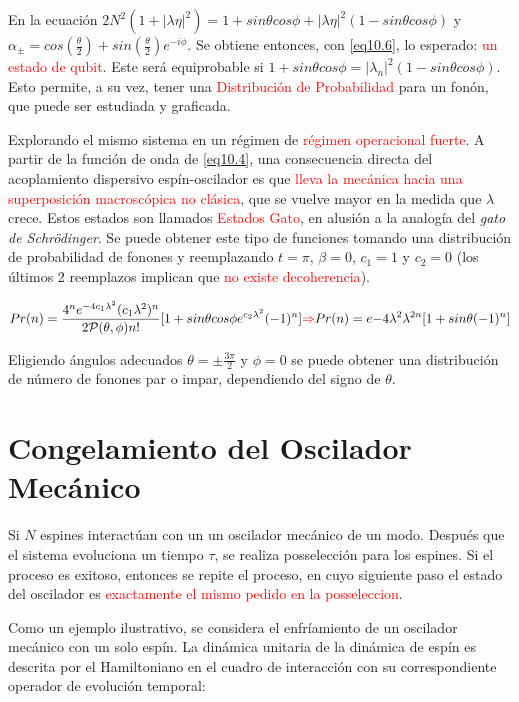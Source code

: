 \documentclass{book}
\begin{document}
En la ecuación $2N^2(1+\lvert\lambda\eta\rvert^2)=1+sin\theta cos\phi+\lvert\lambda\eta\rvert^2(1-sin\theta cos\phi)$ y $\alpha_\pm=cos(\frac{\theta}{2})+sin(\frac{\theta}{2})e^{-i\phi}$. Se obtiene entonces, con \ref{eq10.6}, lo esperado: \textcolor{red}{un estado de qubit}. Este será equiprobable si $1+sin\theta cos\phi=\lvert\lambda_n\rvert^2(1-sin\theta cos\phi)$. Esto permite, a su vez, tener una \textcolor{red}{Distribución de Probabilidad} para un fonón, que puede ser estudiada y graficada.

Explorando el mismo sistema en un régimen de \textcolor{red}{régimen operacional fuerte}. A partir de la función de onda de \ref{eq10.4}, una consecuencia directa del acoplamiento dispersivo espín-oscilador es que \textcolor{red}{lleva la mecánica hacia una superposición macroscópica no clásica}, que se vuelve mayor en la medida que $\lambda$ crece. Estos estados son llamados \textcolor{red}{Estados Gato}, en alusión a la analogía del \textit{gato de Schr\"odinger}. Se puede obtener este tipo de funciones tomando una distribución de probabilidad de fonones y reemplazando $t=\pi$, $\beta=0$, $c_1=1$ y $c_2=0$ (los últimos 2 reemplazos implican que \textcolor{red}{no existe decoherencia}).

\begin{equation}\label{eq10.7}Pr(n)=\frac{4^ne^{-4c_1\lambda^2}(c_1\lambda^2)^n}{2\mathcal{P}(\theta,\phi)n!}[1+sin\theta cos\phi e^{c_2\lambda^2}(-1)^n]\textcolor{red}{\Rightarrow}Pr(n)=e {-4\lambda^2}\lambda^{2n}[1+sin\theta(-1)^n]\end{equation}

Eligiendo ángulos adecuados $\theta=\pm \frac{3\pi}{2}$ y $\phi=0$ se puede obtener una distribución de número de fonones par o impar, dependiendo del signo de $\theta$.

\section{Congelamiento del Oscilador Mecánico}

Si $N$ espines interactúan con un un oscilador mecánico de un modo. Después que el sistema evoluciona un tiempo $\tau$, se realiza posselección para los espines. Si el proceso es exitoso, entonces se repite el proceso, en cuyo siguiente paso el estado del oscilador es \textcolor{red}{exactamente el mismo pedido en la posseleccion}.

Como un ejemplo ilustrativo, se considera el enfríamiento de un oscilador mecánico con un solo espín. La dinámica unitaria de la dinámica de espín es descrita por el Hamiltoniano en el cuadro de interacción con su correspondiente operador de evolución temporal:
\end{document}
